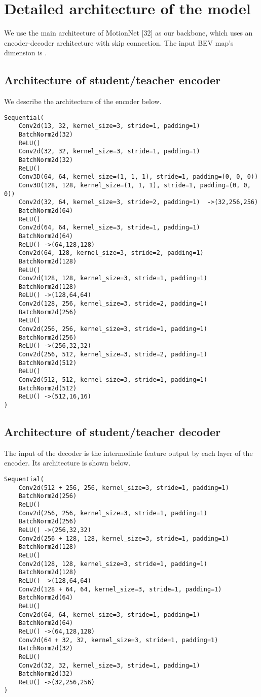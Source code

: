 \documentclass{article}
\begin{document}
\section{Detailed architecture of the model}

We use the main architecture of MotionNet [32] as our backbone, which uses an encoder-decoder architecture with skip connection. The input BEV map's dimension is .

\subsection{Architecture of student/teacher encoder}
We describe the architecture of the encoder below.

\begin{verbatim}
Sequential(
    Conv2d(13, 32, kernel_size=3, stride=1, padding=1)
    BatchNorm2d(32)
    ReLU()
    Conv2d(32, 32, kernel_size=3, stride=1, padding=1)
    BatchNorm2d(32)
    ReLU()
    Conv3D(64, 64, kernel_size=(1, 1, 1), stride=1, padding=(0, 0, 0))
    Conv3D(128, 128, kernel_size=(1, 1, 1), stride=1, padding=(0, 0, 0))
    Conv2d(32, 64, kernel_size=3, stride=2, padding=1)  ->(32,256,256)
    BatchNorm2d(64)
    ReLU()
    Conv2d(64, 64, kernel_size=3, stride=1, padding=1)
    BatchNorm2d(64)
    ReLU() ->(64,128,128)
    Conv2d(64, 128, kernel_size=3, stride=2, padding=1)
    BatchNorm2d(128)
    ReLU()
    Conv2d(128, 128, kernel_size=3, stride=1, padding=1)
    BatchNorm2d(128)
    ReLU() ->(128,64,64)
    Conv2d(128, 256, kernel_size=3, stride=2, padding=1)
    BatchNorm2d(256)
    ReLU()
    Conv2d(256, 256, kernel_size=3, stride=1, padding=1)
    BatchNorm2d(256)
    ReLU() ->(256,32,32)
    Conv2d(256, 512, kernel_size=3, stride=2, padding=1)
    BatchNorm2d(512)
    ReLU()
    Conv2d(512, 512, kernel_size=3, stride=1, padding=1)
    BatchNorm2d(512)
    ReLU() ->(512,16,16)
)
\end{verbatim}

\subsection{Architecture of student/teacher decoder}
The input of the decoder is the intermediate feature output by each layer of the encoder. Its architecture is shown below.

\begin{verbatim}
Sequential(
    Conv2d(512 + 256, 256, kernel_size=3, stride=1, padding=1)
    BatchNorm2d(256)
    ReLU()
    Conv2d(256, 256, kernel_size=3, stride=1, padding=1)
    BatchNorm2d(256)
    ReLU() ->(256,32,32)
    Conv2d(256 + 128, 128, kernel_size=3, stride=1, padding=1)
    BatchNorm2d(128)
    ReLU()
    Conv2d(128, 128, kernel_size=3, stride=1, padding=1)
    BatchNorm2d(128)
    ReLU() ->(128,64,64)
    Conv2d(128 + 64, 64, kernel_size=3, stride=1, padding=1)
    BatchNorm2d(64)
    ReLU()
    Conv2d(64, 64, kernel_size=3, stride=1, padding=1)
    BatchNorm2d(64)
    ReLU() ->(64,128,128)
    Conv2d(64 + 32, 32, kernel_size=3, stride=1, padding=1)
    BatchNorm2d(32)
    ReLU()
    Conv2d(32, 32, kernel_size=3, stride=1, padding=1)
    BatchNorm2d(32)
    ReLU() ->(32,256,256)
)
\end{verbatim}
\end{document}
